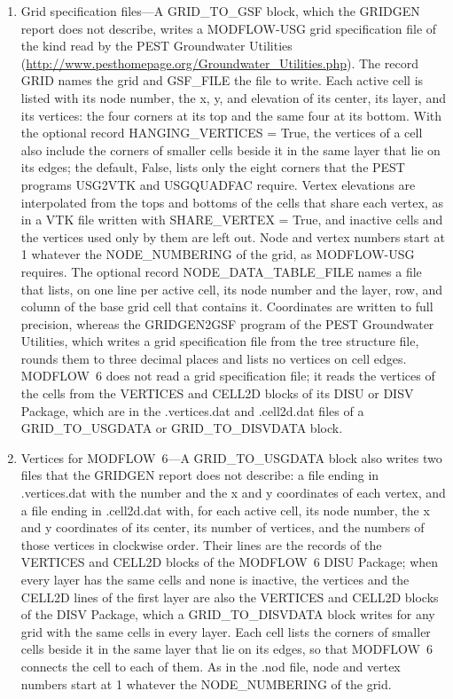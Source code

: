\documentclass[11pt,twoside,twocolumn]{usgsreport}
\begin{document}
\begin{enumerate}
  \item Grid specification files---A GRID\_TO\_GSF block, which the GRIDGEN report does not describe, writes a MODFLOW-USG grid specification file of the kind read by the PEST Groundwater Utilities (\url{http://www.pesthomepage.org/Groundwater_Utilities.php}). The record GRID names the grid and GSF\_FILE the file to write. Each active cell is listed with its node number, the x, y, and elevation of its center, its layer, and its vertices: the four corners at its top and the same four at its bottom. With the optional record HANGING\_VERTICES = True, the vertices of a cell also include the corners of smaller cells beside it in the same layer that lie on its edges; the default, False, lists only the eight corners that the PEST programs USG2VTK and USGQUADFAC require. Vertex elevations are interpolated from the tops and bottoms of the cells that share each vertex, as in a VTK file written with SHARE\_VERTEX = True, and inactive cells and the vertices used only by them are left out. Node and vertex numbers start at 1 whatever the NODE\_NUMBERING of the grid, as MODFLOW-USG requires. The optional record NODE\_DATA\_TABLE\_FILE names a file that lists, on one line per active cell, its node number and the layer, row, and column of the base grid cell that contains it. Coordinates are written to full precision, whereas the GRIDGEN2GSF program of the PEST Groundwater Utilities, which writes a grid specification file from the tree structure file, rounds them to three decimal places and lists no vertices on cell edges. MODFLOW~6 does not read a grid specification file; it reads the vertices of the cells from the VERTICES and CELL2D blocks of its DISU or DISV Package, which are in the .vertices.dat and .cell2d.dat files of a GRID\_TO\_USGDATA or GRID\_TO\_DISVDATA block.
  \item Vertices for MODFLOW~6---A GRID\_TO\_USGDATA block also writes two files that the GRIDGEN report does not describe: a file ending in .vertices.dat with the number and the x and y coordinates of each vertex, and a file ending in .cell2d.dat with, for each active cell, its node number, the x and y coordinates of its center, its number of vertices, and the numbers of those vertices in clockwise order. Their lines are the records of the VERTICES and CELL2D blocks of the MODFLOW~6 DISU Package; when every layer has the same cells and none is inactive, the vertices and the CELL2D lines of the first layer are also the VERTICES and CELL2D blocks of the DISV Package, which a GRID\_TO\_DISVDATA block writes for any grid with the same cells in every layer. Each cell lists the corners of smaller cells beside it in the same layer that lie on its edges, so that MODFLOW~6 connects the cell to each of them. As in the .nod file, node and vertex numbers start at 1 whatever the NODE\_NUMBERING of the grid.

\end{enumerate}
\end{document}

